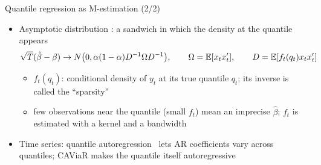 \begin{frame}{Quantile regression as M-estimation (2/2)}
\itemsize{\small}
\begin{itemize}
    \item Asymptotic distribution : a sandwich in which the density at the quantile appears
    \[ \sqrt T(\hat\beta - \beta) \to N\big(0, \alpha(1 - \alpha)D^{-1}\Omega D^{-1}\big), \qquad \Omega = \mathbb{E}[x_tx_t'], \qquad D = \mathbb{E}[f_t(q_t)x_tx_t'] \]
    \begin{itemize}
        \item $f_t(q_t)$: conditional density of $y_t$ at its true quantile $q_t$; its inverse is called the ``sparsity''
        \item few observations near the quantile (small $f_t$) mean an imprecise $\hat\beta$; $f_t$ is estimated with a kernel and a bandwidth
    \end{itemize}
    \item Time series: quantile autoregression \ lets AR coefficients vary across quantiles; CAViaR makes the quantile itself autoregressive
\end{itemize}
\end{frame}

